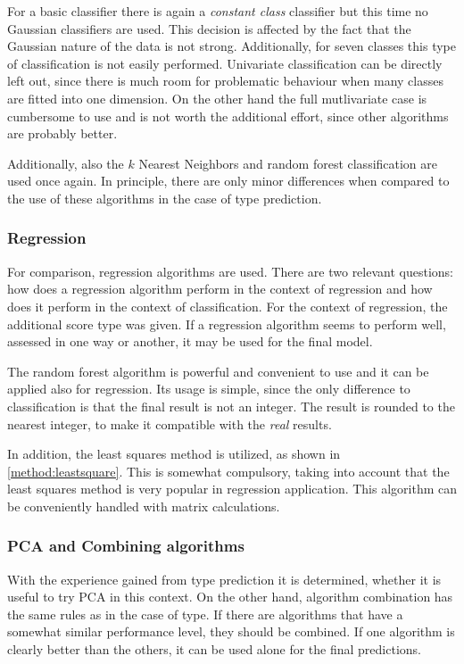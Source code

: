 \documentclass[twoside]{article}
\begin{document}
\begin{multicols}{2}
For a basic classifier there is again a \emph{constant class} classifier but this time no Gaussian classifiers are used. This decision
is affected by the fact that the Gaussian nature of the data is not strong. Additionally, for seven classes this type of classification
is not easily performed. Univariate classification can be directly left out, since there is much room for problematic behaviour when
many classes are fitted into one dimension. On the other hand the full mutlivariate case is cumbersome to use and is not worth the 
additional effort, since other algorithms are probably better.

Additionally, also the $k$ Nearest Neighbors and random forest classification are used once again. In principle, there are only minor
differences when compared to the use of these algorithms in the case of type prediction.

\subsubsection{Regression}

For comparison, regression algorithms are used. There are two relevant questions: how does a regression algorithm perform in the context
of regression and how does it perform in the context of classification. For the context of regression, the additional score type was
given. If a regression algorithm seems to perform well, assessed in one way or another, it may be used for the final model.

The random forest algorithm is powerful and convenient to use and it can be applied also for regression. Its usage is simple,
since the only difference to classification is that the final result is not an integer. The result is rounded to the nearest
integer, to make it compatible with the \emph{real} results.

In addition, the least squares method is utilized, as shown in \ref{method:leastsquare}. This is somewhat compulsory, taking
into account that the least squares method is very popular in regression application. This algorithm can be conveniently
handled with matrix calculations.

\subsubsection{PCA and Combining algorithms}

With the experience gained from type prediction it is determined, whether it is useful to try PCA 
in this context. On the other hand, algorithm combination has the same rules as in the case of 
type. If there are algorithms that have a somewhat similar performance level, they should be
combined. If one algorithm is clearly better than the others, it can be used alone for the final predictions.


\end{multicols}
\end{document}
